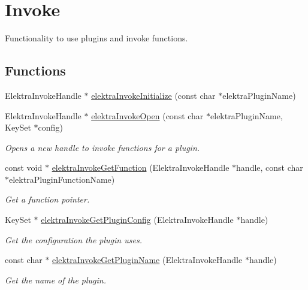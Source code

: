 \hypertarget{group__invoke}{}\section{Invoke}
\label{group__invoke}


Functionality to use plugins and invoke functions.  


\subsection*{Functions}
\begin{DoxyCompactItemize}
\item 
Elektra\+Invoke\+Handle $\ast$ \hyperlink{group__invoke_gaae89e2497eba478be2043f1b25adbb3c}{elektra\+Invoke\+Initialize} (const char $\ast$elektra\+Plugin\+Name)
\item 
Elektra\+Invoke\+Handle $\ast$ \hyperlink{group__invoke_ga3fd9791ecf43c0dde08a2fc1f02db6bc}{elektra\+Invoke\+Open} (const char $\ast$elektra\+Plugin\+Name, Key\+Set $\ast$config)
\begin{DoxyCompactList}\small\item\em Opens a new handle to invoke functions for a plugin. \end{DoxyCompactList}\item 
const void $\ast$ \hyperlink{group__invoke_ga4531a643a71a63c19c94d87bd8d0b40f}{elektra\+Invoke\+Get\+Function} (Elektra\+Invoke\+Handle $\ast$handle, const char $\ast$elektra\+Plugin\+Function\+Name)
\begin{DoxyCompactList}\small\item\em Get a function pointer. \end{DoxyCompactList}\item 
Key\+Set $\ast$ \hyperlink{group__invoke_gafc090b80f3ba846bf3c3fd8ccd34f2f5}{elektra\+Invoke\+Get\+Plugin\+Config} (Elektra\+Invoke\+Handle $\ast$handle)
\begin{DoxyCompactList}\small\item\em Get the configuration the plugin uses. \end{DoxyCompactList}\item 
const char $\ast$ \hyperlink{group__invoke_ga13bd3afe428624d459239df73641d769}{elektra\+Invoke\+Get\+Plugin\+Name} (Elektra\+Invoke\+Handle $\ast$handle)
\begin{DoxyCompactList}\small\item\em Get the name of the plugin. \end{DoxyCompactList}\item 

\end{DoxyCompactItemize}
